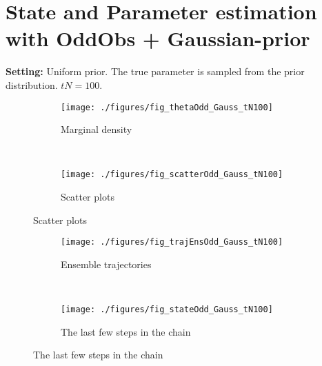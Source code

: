 \documentclass[12pt]{article}
\begin{document}
\section{State and Parameter estimation with OddObs + Gaussian-prior}
{\bf Setting:} Uniform prior. The true parameter is sampled from the prior distribution. $tN=100$. 
\begin{figure}[h!]
   \caption{Parameter estimation}\label{fig:traj} \vspace{-2mm}
    \centering
    \hspace{-20mm}
    \begin{subfigure}[b]{0.45\textwidth}        \caption{Marginal density}\vspace{-2mm}
        \texttt{[image: ./figures/fig\_thetaOdd\_Gauss\_tN100]} %
        \label{fig:gull}
    \end{subfigure}
    ~ %
    \begin{subfigure}[b]{0.45\textwidth}          \caption{Scatter plots}\vspace{-2mm}
        \texttt{[image: ./figures/fig\_scatterOdd\_Gauss\_tN100]} %
        \label{fig:tiger}
    \end{subfigure}
\end{figure}
\begin{figure}[h!]
  \caption{State estimation} \label{fig:traj} \vspace{-4mm}
    \centering
    \hspace{-20mm}
    \begin{subfigure}[b]{0.45\textwidth}
        \texttt{[image: ./figures/fig\_trajEnsOdd\_Gauss\_tN100]}
        \caption{Ensemble trajectories}
        \label{fig:gull}
    \end{subfigure}
    ~ %
    \begin{subfigure}[b]{0.45\textwidth}
        \texttt{[image: ./figures/fig\_stateOdd\_Gauss\_tN100]}
          \caption{The last few steps in the chain}
        \label{fig:tiger}
    \end{subfigure}
\end{figure}
\end{document}
